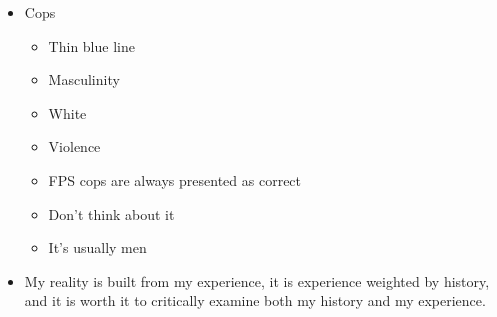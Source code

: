 \documentclass{report}
\begin{document}
\begin{description}
\begin{mdframed}
\begin{itemize}
\begin{itemize}
                    \end{itemize}
                \item Cops
                    \begin{itemize}
                        \item Thin blue line
                        \item Masculinity
                        \item White
                        \item Violence
                        \item FPS cops are always presented as correct
                        \item Don't think about it
                        \item It's usually men
                    \end{itemize}
                \item My reality is built from my experience,
                    it is experience weighted by history,
                    and it is worth it to critically examine
                    both my history and my experience.


\end{itemize}
\end{mdframed}
\end{description}
\end{document}
